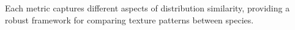 \documentclass[a4paper,12pt]{report}
\begin{document}
Each metric captures different aspects of distribution similarity, providing a robust framework for comparing texture patterns between species.








\end{document}
